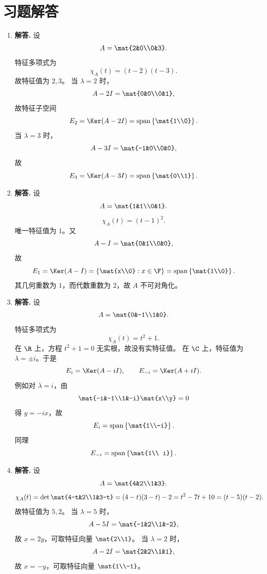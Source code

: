 \section*{习题解答}
\begin{enumerate}[label=\textbf{\arabic*.}, leftmargin=*, itemsep=1em]
\item \textbf{解答.} 设
\[
A=\mat{2&0\\0&3}.
\]
特征多项式为
\[
\chi_A(t)=(t-2)(t-3).
\]
故特征值为 \(2,3\)。  
当 \(\lambda=2\) 时，
\[
A-2I=\mat{0&0\\0&1},
\]
故特征子空间
\[
E_2=\Ker(A-2I)=\operatorname{span}\left\{\mat{1\\0}\right\}.
\]
当 \(\lambda=3\) 时，
\[
A-3I=\mat{-1&0\\0&0},
\]
故
\[
E_3=\Ker(A-3I)=\operatorname{span}\left\{\mat{0\\1}\right\}.
\]

\item \textbf{解答.} 设
\[
A=\mat{1&1\\0&1}.
\]
\[
\chi_A(t)=(t-1)^2.
\]
唯一特征值为 \(1\)。又
\[
A-I=\mat{0&1\\0&0},
\]
故
\[
E_1=\Ker(A-I)=\left\{\mat{x\\0}:x\in\F\right\}
=\operatorname{span}\left\{\mat{1\\0}\right\}.
\]
其几何重数为 \(1\)，而代数重数为 \(2\)，故 \(A\) 不可对角化。

\item \textbf{解答.} 设
\[
A=\mat{0&-1\\1&0}.
\]
特征多项式为
\[
\chi_A(t)=t^2+1.
\]
在 \(\R\) 上，方程 \(t^2+1=0\) 无实根，故没有实特征值。  
在 \(\C\) 上，特征值为 \(\lambda=\pm i\)。于是
\[
E_i=\Ker(A-iI),\qquad E_{-i}=\Ker(A+iI).
\]
例如对 \(\lambda=i\)，由
\[
\mat{-i&-1\\1&-i}\mat{x\\y}=0
\]
得 \(y=-ix\)，故
\[
E_i=\operatorname{span}\left\{\mat{1\\-i}\right\}.
\]
同理
\[
E_{-i}=\operatorname{span}\left\{\mat{1\\ i}\right\}.
\]

\item \textbf{解答.} 设
\[
A=\mat{4&2\\1&3}.
\]
\[
\chi_A(t)=\det\mat{4-t&2\\1&3-t}=(4-t)(3-t)-2=t^2-7t+10=(t-5)(t-2).
\]
故特征值为 \(5,2\)。  
当 \(\lambda=5\) 时，
\[
A-5I=\mat{-1&2\\1&-2},
\]
故 \(x=2y\)，可取特征向量 \(\mat{2\\1}\)。  
当 \(\lambda=2\) 时，
\[
A-2I=\mat{2&2\\1&1},
\]
故 \(x=-y\)，可取特征向量 \(\mat{1\\-1}\)。


\end{enumerate}
